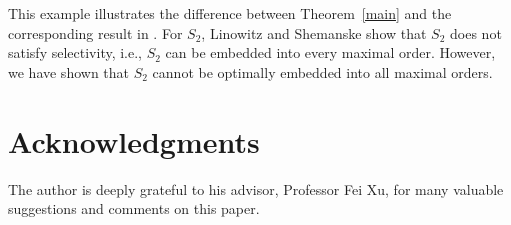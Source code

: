 \documentclass[12pt]{article}
\theoremstyle{plain}
\theoremstyle{definition}
\theoremstyle{remark}
\begin{document}
This example illustrates the difference between Theorem~\ref{main} and the corresponding result in \cite[Theorem 3.3]{Linowitz2012}. For $S_2$, Linowitz and Shemanske show that $S_2$ does not satisfy selectivity, i.e., $S_2$ can be embedded into every maximal order. However, we have shown that $S_2$ cannot be optimally embedded into all maximal orders.


\section*{Acknowledgments}
The author is deeply grateful to his advisor, Professor Fei Xu, for many valuable suggestions and comments on this paper.



 
\end{document}
